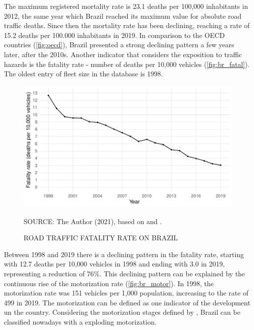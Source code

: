 The maximum registered mortality rate is 23.1 deaths per 100,000 inhabitants in 2012, the same year which Brazil reached its maximum value for absolute road traffic deaths. Since then the mortality rate has been declining, reaching a rate of 15.2 deaths per 100.000 inhabitants in 2019. In comparison to the OECD countries (\autoref{fig:oecd}), Brazil presented a strong declining pattern a few years later, after the 2010s. Another indicator that considers the exposition to traffic hazards is the fatality rate - number of deaths per 10,000 vehicles (\autoref{fig:br_fatal}). The oldest entry of fleet size in the \textcite{DENATRAN2020} database is 1998.

\begin{figure}[!htbp]
    \centering\footnotesize
    \captionsetup{font=footnotesize}
    \caption{ROAD TRAFFIC FATALITY RATE ON BRAZIL}
    \includegraphics{fig/brazil_fatality.pdf}
    \label{fig:br_fatal}
    \par SOURCE: The Author (2021), based on \textcite{MinistryofHealth2020} and \textcite{DENATRAN2020}.
\end{figure}                                

Between 1998 and 2019 there is a declining pattern in the fatality rate, starting with 12.7 deaths per 10,000 vehicles in 1998 and ending with 3.0 in 2019, representing a reduction of 76\%. This declining pattern can be explained by the continuous rise of the motorization rate (\autoref{fig:br_motor}). In 1998, the motorization rate was 151 vehicles per 1,000 population, increasing to the rate of 499 in 2019. The motorization can be defined as one indicator of the development un the country. Considering the motorization stages defined by \textcite{Jorgensen2005}, Brazil can be classified nowadays with a exploding motorization. 

